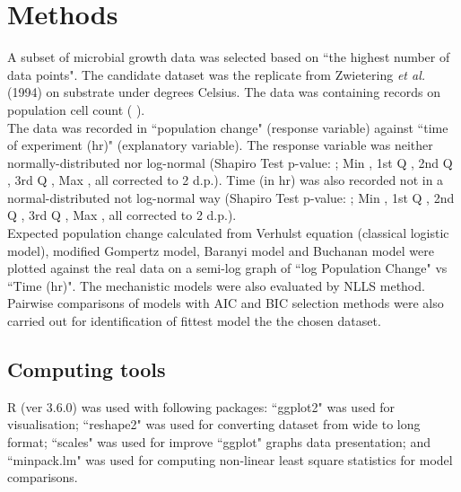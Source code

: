 \documentclass[a4paper, 11pt]{article}
\begin{document}
	\section*{Methods}
	A subset of microbial growth data was selected based on ``the highest number of data points".  The candidate dataset was the replicate %
	 from Zwietering \textit{et al.}(1994)\autocite{zwietering1994modeling} \textit{%
	}on %
	 substrate under %
	 degrees Celsius.  The data was containing %
	 records on population cell count (%
).\\
	The data was recorded in ``population change" (response variable) against ``time of experiment (hr)" (explanatory variable).  The response variable was neither normally-distributed nor log-normal (Shapiro Test p-value: %
	; Min
	, 1st Q
	, 2nd Q
	, 3rd Q
	, Max
	, all corrected to 2 d.p.).  Time (in hr) was also recorded not in a normal-distributed not log-normal way (Shapiro Test p-value: %
	; Min
	, 1st Q
	, 2nd Q
	, 3rd Q
	, Max
	, all corrected to 2 d.p.).\\
	Expected population change calculated from Verhulst equation (classical logistic model)\autocite{mckendrick1912xlv}, modified Gompertz model\autocite{GIL200689}, Baranyi model\autocite{baranyi1993modeling} and Buchanan model\autocite{buchanan1993differentiation} were plotted against the real data on a semi-log graph of ``log Population Change" vs ``Time (hr)".  The mechanistic models were also evaluated by NLLS method\autocite{kelley1999iterative,strutz2010data}.  Pairwise comparisons of models with AIC\autocite{akaike1998information,burnhamdr} and BIC\autocite{schwarz1978estimating} selection methods were also carried out for identification of fittest model the the chosen dataset.
	\subsection*{Computing tools}
	R (ver 3.6.0)\autocite{Rcore} was used with following packages: ``ggplot2"\autocite{ggplot2} was used for visualisation; ``reshape2"\autocite{reshape2} was used for converting dataset from wide to long format; ``scales"\autocite{scales} was used for improve ``ggplot" graphs data presentation; and ``minpack.lm"\autocite{minpacklm} was used for computing non-linear least square statistics for model comparisons.
	
\end{document}
